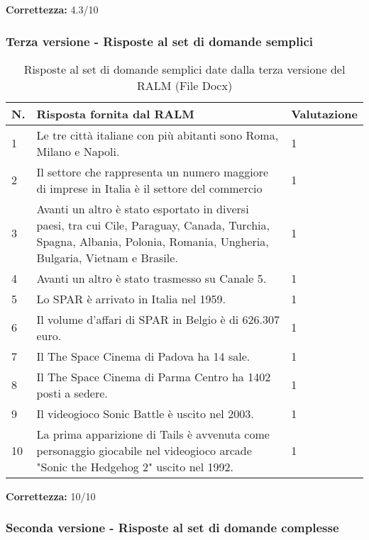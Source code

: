 \textbf{Correttezza:} 4.3/10

\subsubsection{Terza versione - Risposte al set di domande semplici}

\begin{table}[H]
    \centering
    \begin{tabular}{|p{0.5cm} |p{6cm} |p{2cm}|}
        \hline
        \textbf{N}. & \textbf{Risposta fornita dal RALM} & \textbf{Valutazione} \\
        \hline
        1 & Le tre città italiane con più abitanti sono Roma, Milano e Napoli. & 1 \\
        \hline
        2 & Il settore che rappresenta un numero maggiore di imprese in Italia è il settore del commercio & 1 \\
        \hline
        3 & Avanti un altro è stato esportato in diversi paesi, tra cui Cile, Paraguay, Canada, Turchia, Spagna, Albania, Polonia, Romania, Ungheria, Bulgaria, Vietnam e Brasile. & 1 \\
        \hline
        4 & Avanti un altro è stato trasmesso su Canale 5. & 1 \\
        \hline
        5 & Lo SPAR è arrivato in Italia nel 1959. & 1 \\
        \hline
        6 & Il volume d'affari di SPAR in Belgio è di 626.307 euro. & 1 \\
        \hline
        7 & Il The Space Cinema di Padova ha 14 sale. & 1 \\
        \hline
        8 & Il The Space Cinema di Parma Centro ha 1402 posti a sedere. & 1 \\
        \hline
        9 & Il videogioco Sonic Battle è uscito nel 2003. & 1 \\
        \hline
        10 & La prima apparizione di Tails è avvenuta come personaggio giocabile nel videogioco arcade "Sonic the Hedgehog 2" uscito nel 1992. & 1 \\
        \hline
    \end{tabular}
    \caption{Risposte al set di domande semplici date dalla terza versione del RALM (File Docx)}
\end{table}

\textbf{Correttezza:} 10/10

\subsubsection{Seconda versione - Risposte al set di domande complesse}

